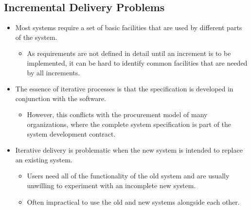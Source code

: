 \documentclass{report}
\begin{document}
\subsection{Incremental Delivery Problems}
\begin{itemize}
  \item Most systems require a set of basic facilities that are used by different parts of the system.
  \begin{itemize}
    \item As requirements are not defined in detail until an increment is to be implemented, it can be hard to identify common facilities that are needed by all increments. 
  \end{itemize}
  \item The essence of iterative processes is that the specification is developed in conjunction with the software.
  \begin{itemize}
    \item However, this conflicts with the procurement model of many organizations, where the complete system specification is part of the system development contract.
  \end{itemize}
  \item Iterative delivery is problematic when the new system is intended to replace an existing system.
  \begin{itemize}
    \item Users need all of the functionality of the old system and are usually unwilling to experiment with an incomplete new system.
    \item Often impractical to use the old and new systems alongside each other.
  \end{itemize}
\end{itemize}
\end{document}
